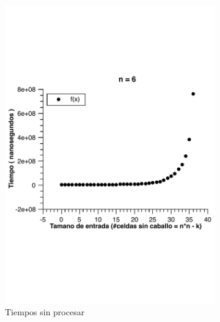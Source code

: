 \begin{figure}[H]
        \centering
        \begin{subfigure}[b]{0.5\textwidth}
                \includegraphics[width=\textwidth]{imagenes/grafico3-n-6-norm.pdf}
                \caption{Tiempos sin procesar}
        \end{subfigure}%
        ~ %
        \begin{subfigure}[b]{0.5\textwidth}

\end{subfigure}
\end{figure}
